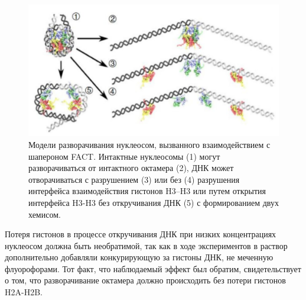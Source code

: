 \begin{figure} [H]
    \centering
    \includegraphics[width=\textwidth]{images/p6/p6_3/p6_3_f24.pdf}
    \caption[Модели разворачивания нуклеосом, вызванного взаимодействием с шапероном FACT]{Модели разворачивания нуклеосом, вызванного взаимодействием с шапероном FACT. Интактные нуклеосомы (1) могут разворачиваться от интактного октамера (2), ДНК может отворачиваться с разрушением (3) или без (4) разрушения интерфейса взаимодействия гистонов H3–H3 или путем открытия интерфейса H3-H3 без откручивания ДНК (5) с формированием двух хемисом.}
    \label{fig:p6_3_f24}
\end{figure}
    
    Потеря гистонов в процессе откручивания ДНК при низких концентрациях нуклеосом должна быть необратимой, так как в ходе экспериментов в раствор дополнительно добавляли конкурирующую за гистоны ДНК, не меченную флуорофорами. Тот факт, что наблюдаемый эффект был обратим, свидетельствует о том, что разворачивание октамера должно происходить без потери гистонов H2A-H2B.
    
    
    
    
    
    
    
    
    
    
    
    
    
    
    
    
    
    
    
    
    
    
    
    
    
    
    
    
    
    
    
    
    
    
    
    
    
    
    
    
    
    
    
    
    
    
    
    
    
    
    
    
    
    
    
    
    
    
    
    
    
    